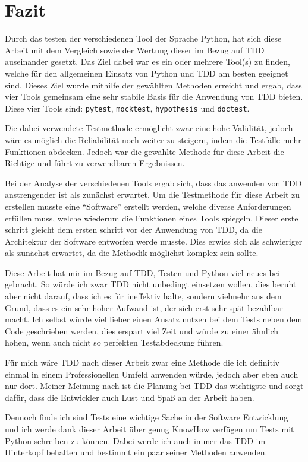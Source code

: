 \section{Fazit}\label{fazit}

Durch das testen der verschiedenen Tool der Sprache Python, hat sich diese
Arbeit mit dem Vergleich sowie der Wertung dieser im Bezug auf TDD auseinander
gesetzt. Das Ziel dabei war es ein oder mehrere Tool(s) zu finden, welche für
den allgemeinen Einsatz von Python und TDD am besten geeignet sind. Dieses
Ziel wurde mithilfe der gewählten Methoden erreicht und ergab, dass vier Tools
gemeinsam eine sehr stabile Basis für die Anwendung von TDD bieten. Diese vier
Tools sind: \lstinline{pytest}, \lstinline{mocktest}, \lstinline{hypothesis} und
\lstinline{doctest}.

Die dabei verwendete Testmethode ermöglicht zwar eine hohe Validität, jedoch
wäre es möglich die Reliabilität noch weiter zu steigern, indem die Testfälle
mehr Funktionen abdecken. Jedoch war die gewählte Methode für diese Arbeit die
Richtige und führt zu verwendbaren Ergebnissen.

Bei der Analyse der verschiedenen Tools ergab sich, dass das anwenden von TDD 
anstrengender ist als zunächst erwartet. Um die Testmethode für diese Arbeit zu 
erstellen musste eine "`Software"' erstellt werden, welche diverse 
Anforderungen erfüllen muss, welche wiederum die Funktionen eines Tools 
spiegeln. Dieser erste schritt gleicht dem ersten schritt vor der Anwendung von 
TDD, da die Architektur der Software entworfen werde musste. Dies erwies sich 
als schwieriger als zunächst erwartet, da die Methodik möglichst komplex sein 
sollte.

Diese Arbeit hat mir im Bezug auf TDD, Testen und Python viel neues bei
gebracht. So würde ich zwar TDD nicht unbedingt einsetzen wollen, dies beruht
aber nicht darauf, dass ich es für ineffektiv halte, sondern vielmehr aus dem
Grund, dass es ein sehr hoher Aufwand ist, der sich erst sehr spät bezahlbar
macht. Ich selbst würde viel lieber einen Ansatz nutzen bei dem Tests neben dem 
Code geschrieben werden, dies erspart viel Zeit und würde zu einer ähnlich 
hohen, wenn auch nicht so perfekten Testabdeckung führen.

Für mich wäre TDD nach dieser Arbeit zwar eine Methode die ich definitiv einmal 
in einem Professionellen Umfeld anwenden würde, jedoch aber eben auch nur dort. 
Meiner Meinung nach ist die Planung bei TDD das wichtigste und sorgt dafür, 
dass die Entwickler auch Lust und Spaß an der Arbeit haben.

Dennoch finde ich sind Tests eine wichtige Sache in der Software Entwicklung 
und ich werde dank dieser Arbeit über genug KnowHow verfügen um Tests mit 
Python schreiben zu können. Dabei werde ich auch immer das TDD im Hinterkopf 
behalten und bestimmt ein paar seiner Methoden anwenden.
